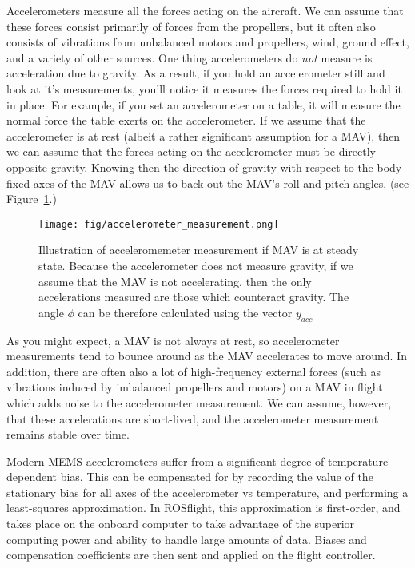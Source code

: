 \documentclass[paper=a4, fontsize=11pt]{scrartcl} %
\numberwithin{equation}{section} %
\numberwithin{figure}{section} %
\numberwithin{table}{section} %
\begin{document}
Accelerometers measure all the forces acting on the aircraft.  We can assume that these forces consist primarily of forces from the propellers, but it often also consists of vibrations from unbalanced motors and propellers, wind, ground effect, and a variety of other sources. One thing accelerometers do \textit{not} measure is acceleration due to gravity.  As a result, if you hold an accelerometer still and look at it's measurements, you'll notice it measures the forces required to hold it in place.  For example, if you set an accelerometer on a table, it will measure the normal force the table exerts on the accelerometer.  If we assume that the accelerometer is at rest (albeit a rather significant assumption for a MAV), then we can assume that the forces acting on the accelerometer must be directly opposite gravity.  Knowing then the direction of gravity with respect to the body-fixed axes of the MAV allows us to back out the MAV's roll and pitch angles.  (see Figure~\ref{fig:accelerometer_measure}.)

\begin{figure}[h]
\centering
\texttt{[image: fig/accelerometer\_measurement.png]}
\caption{Illustration of acceleromemeter measurement if MAV is at steady state.  Because the accelerometer does not measure gravity, if we assume that the MAV is not accelerating, then the only accelerations measured are those which counteract gravity.  The angle $\phi$ can be therefore calculated using the vector $y_{acc}$}
\label{fig:accelerometer_measure}

\end{figure}

As you might expect, a MAV is not always at rest, so accelerometer measurements tend to bounce around as the MAV accelerates to move around.  In addition, there are often also a lot of high-frequency external forces (such as vibrations induced by imbalanced propellers and motors) on a MAV in flight which adds noise to the accelerometer measurement.  We can assume, however, that these accelerations are short-lived, and the accelerometer measurement remains stable over time.

Modern MEMS accelerometers suffer from a significant degree of temperature-dependent bias.  This can be compensated for by recording the value of the stationary bias for all axes of the accelerometer vs temperature, and performing a least-squares approximation.  In ROSflight, this approximation is first-order, and takes place on the onboard computer to take advantage of the superior computing power and ability to handle large amounts of data.  Biases and compensation coefficients are then sent and applied on the flight controller.
\end{document}
